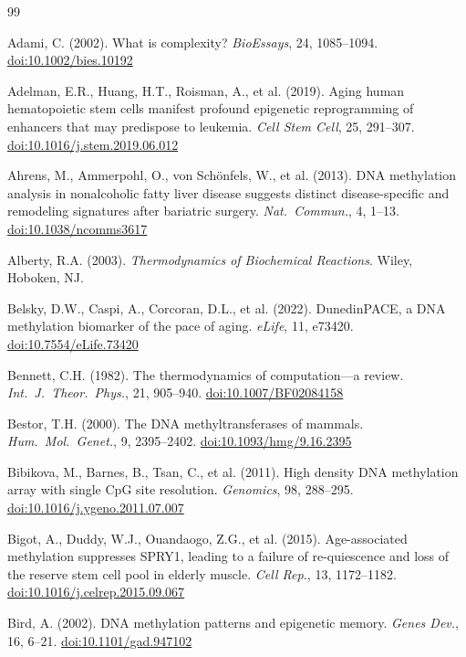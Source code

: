\documentclass[12pt,a4paper]{article}
\newcommand{\doi}[1]{\href{https://doi.org/#1}{doi:#1}}
\begin{document}
\begin{thebibliography}{99}
\raggedright

Adami, C. (2002).
What is complexity?
\textit{BioEssays}, 24, 1085--1094.
\doi{10.1002/bies.10192}

Adelman, E.R., Huang, H.T., Roisman, A., et al. (2019).
Aging human hematopoietic stem cells manifest profound epigenetic reprogramming of enhancers that may predispose to leukemia.
\textit{Cell Stem Cell}, 25, 291--307.
\doi{10.1016/j.stem.2019.06.012}

Ahrens, M., Ammerpohl, O., von Sch\"onfels, W., et al. (2013).
DNA methylation analysis in nonalcoholic fatty liver disease suggests distinct disease-specific and remodeling signatures after bariatric surgery.
\textit{Nat.\ Commun.}, 4, 1–13.
\doi{10.1038/ncomms3617}

Alberty, R.A. (2003).
\textit{Thermodynamics of Biochemical Reactions}.
Wiley, Hoboken, NJ.

Belsky, D.W., Caspi, A., Corcoran, D.L., et al. (2022).
DunedinPACE, a DNA methylation biomarker of the pace of aging.
\textit{eLife}, 11, e73420.
\doi{10.7554/eLife.73420}

Bennett, C.H. (1982).
The thermodynamics of computation---a review.
\textit{Int.\ J.\ Theor.\ Phys.}, 21, 905--940.
\doi{10.1007/BF02084158}

Bestor, T.H. (2000).
The DNA methyltransferases of mammals.
\textit{Hum.\ Mol.\ Genet.}, 9, 2395--2402.
\doi{10.1093/hmg/9.16.2395}

Bibikova, M., Barnes, B., Tsan, C., et al. (2011).
High density DNA methylation array with single CpG site resolution.
\textit{Genomics}, 98, 288--295.
\doi{10.1016/j.ygeno.2011.07.007}

Bigot, A., Duddy, W.J., Ouandaogo, Z.G., et al. (2015).
Age-associated methylation suppresses SPRY1, leading to a failure of re-quiescence and loss of the reserve stem cell pool in elderly muscle.
\textit{Cell Rep.}, 13, 1172--1182.
\doi{10.1016/j.celrep.2015.09.067}

Bird, A. (2002).
DNA methylation patterns and epigenetic memory.
\textit{Genes Dev.}, 16, 6--21.
\doi{10.1101/gad.947102}


\end{thebibliography}
\end{document}
